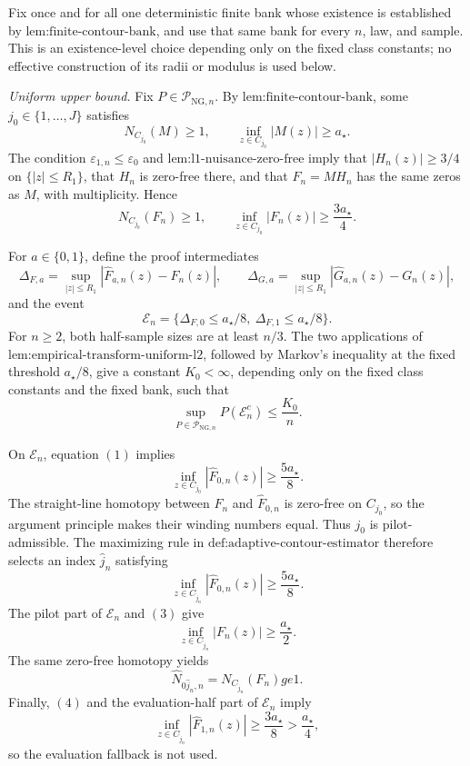 Fix once and for all one deterministic finite bank whose existence is established by \(\text{lem:finite-contour-bank}\), and use that same bank for every \(n\), law, and sample.  This is an existence-level choice depending only on the fixed class constants; no effective construction of its radii or modulus is used below.

\emph{Uniform upper bound.}
Fix \(P\in\mathcal P_{\mathrm{NG},n}\).  By \(\text{lem:finite-contour-bank}\), some \(j_0\in\{1,\ldots,J\}\) satisfies
\[
 N_{C_{j_0}}(M)\ge1,
 \qquad
 \inf_{z\in C_{j_0}}|M(z)|\ge a_{\star}.
\]
The condition \(\varepsilon_{1,n}\le\varepsilon_0\) and \(\text{lem:l1-nuisance-zero-free}\) imply that \(|H_n(z)|\ge3/4\) on \(\{|z|\le R_1\}\), that \(H_n\) is zero-free there, and that \(F_n=M H_n\) has the same zeros as \(M\), with multiplicity.  Hence
\[
 N_{C_{j_0}}(F_n)\ge1,
 \qquad
 \inf_{z\in C_{j_0}}|F_n(z)|\ge\frac{3a_{\star}}4. \tag{1}
\]

For \(a\in\{0,1\}\), define the proof intermediates
\[
 \Delta_{F,a}
 =\sup_{|z|\le R_1}|\widehat F_{a,n}(z)-F_n(z)|,
 \qquad
 \Delta_{G,a}
 =\sup_{|z|\le R_1}|\widehat G_{a,n}(z)-G_n(z)|,
\]
and the event
\[
 \mathcal E_n
 =\{\Delta_{F,0}\le a_{\star}/8,\ 
     \Delta_{F,1}\le a_{\star}/8\}.
\]
For \(n\ge2\), both half-sample sizes are at least \(n/3\).  The two applications of \(\text{lem:empirical-transform-uniform-l2}\), followed by Markov's inequality at the fixed threshold \(a_{\star}/8\), give a constant \(K_0<\infty\), depending only on the fixed class constants and the fixed bank, such that
\[
 \sup_{P\in\mathcal P_{\mathrm{NG},n}}P(\mathcal E_n^c)
 \le\frac{K_0}{n}. \tag{2}
\]

On \(\mathcal E_n\), equation \((1)\) implies
\[
 \inf_{z\in C_{j_0}}|\widehat F_{0,n}(z)|
 \ge\frac{5a_{\star}}8.
\]
The straight-line homotopy between \(F_n\) and \(\widehat F_{0,n}\) is zero-free on \(C_{j_0}\), so the argument principle makes their winding numbers equal.  Thus \(j_0\) is pilot-admissible.  The maximizing rule in \(\text{def:adaptive-contour-estimator}\) therefore selects an index \(\widehat j_n\) satisfying
\[
 \inf_{z\in C_{\widehat j_n}}|\widehat F_{0,n}(z)|
 \ge\frac{5a_{\star}}8. \tag{3}
\]
The pilot part of \(\mathcal E_n\) and \((3)\) give
\[
 \inf_{z\in C_{\widehat j_n}}|F_n(z)|
 \ge\frac{a_{\star}}2. \tag{4}
\]
The same zero-free homotopy yields
\[
 \widehat N_{0\widehat j_n,n}
 =N_{C_{\widehat j_n}}(F_n)ge1. \tag{5}
\]
Finally, \((4)\) and the evaluation-half part of \(\mathcal E_n\) imply
\[
 \inf_{z\in C_{\widehat j_n}}|\widehat F_{1,n}(z)|
 \ge\frac{3a_{\star}}8>\frac{a_{\star}}4, \tag{6}
\]
so the evaluation fallback is not used.

